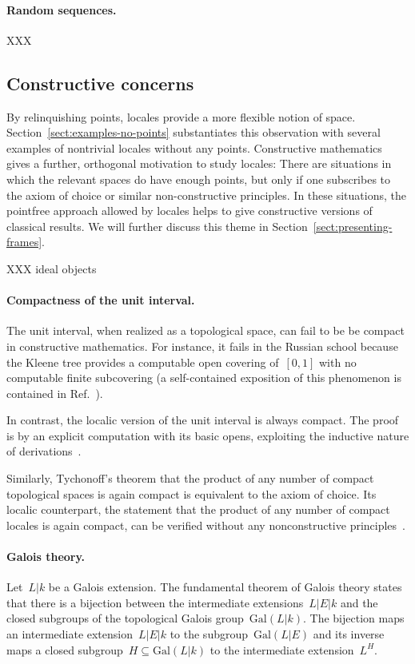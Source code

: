 \documentclass{ws-rv9x6}
\newcommand{\Gal}{\mathrm{Gal}}
\renewcommand{\_}{\mathpunct{.}}
\newcommand{\?}{\,{:}\,}
\begin{document}
\paragraph{Random sequences.} XXX


\subsection{Constructive concerns}

By relinquishing points, locales provide a more flexible notion of space.
Section~\ref{sect:examples-no-points} substantiates this observation
with several examples of nontrivial locales without any points. Constructive
mathematics gives a further, orthogonal motivation to study locales: There are
situations in which the relevant spaces do have enough points, but only if one
subscribes to the axiom of choice or similar non-constructive principles. In
these situations, the pointfree approach allowed by locales helps to give
constructive versions of classical results. We will further discuss this theme
in Section~\ref{sect:presenting-frames}.

XXX ideal objects

\paragraph{Compactness of the unit interval.} The unit interval, when realized
as a topological space, can fail to be be compact in constructive
mathematics. For instance, it fails in the Russian school because the Kleene
tree provides a computable open covering of~$[0,1]$ with no computable finite
subcovering (a self-contained exposition of this phenomenon is contained in
Ref.~).

In contrast, the localic version of the unit interval is always compact. The
proof is by an explicit computation with its basic opens, exploiting the inductive
nature of derivations~\cite{cederquist-negri:heine-borel}.

Similarly, Tychonoff's theorem that the product of any number of compact
topological spaces is again compact is equivalent to the axiom of choice. Its
localic counterpart, the statement that the product of any number of compact
locales is again compact, can be verified without any nonconstructive
principles~\cite{vickers:tychonoff}.

\paragraph{Galois theory.} Let~$L|k$ be a Galois extension. The
fundamental theorem of Galois theory states that there is a bijection between
the intermediate extensions~$L|E|k$ and the closed subgroups of the topological
Galois group~$\Gal(L|k)$. The bijection maps an intermediate extension~$L|E|k$
to the subgroup~$\Gal(L|E)$ and its inverse maps a closed subgroup~$H \subseteq
\Gal(L|k)$ to the intermediate extension~$L^H$.
\end{document}
